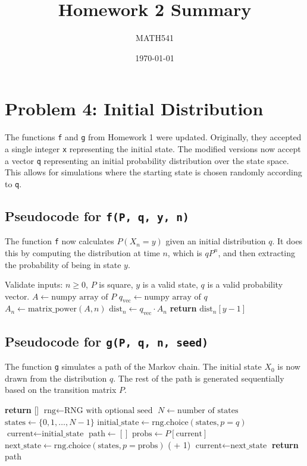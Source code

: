 \documentclass{article}
\title{Homework 2 Summary}
\author{MATH541}
\date{\today}
\begin{document}
\section*{Problem 4: Initial Distribution}

The functions \texttt{f} and \texttt{g} from Homework 1 were updated. Originally, they accepted a single integer \texttt{x} representing the initial state. The modified versions now accept a vector \texttt{q} representing an initial probability distribution over the state space. This allows for simulations where the starting state is chosen randomly according to \texttt{q}.

\subsection*{Pseudocode for \texttt{f(P, q, y, n)}}
The function \texttt{f} now calculates $P(X_n = y)$ given an initial distribution $q$. It does this by computing the distribution at time $n$, which is $q P^n$, and then extracting the probability of being in state $y$.

\begin{algorithmic}[1]
    \State Validate inputs: $n \geq 0$, $P$ is square, $y$ is a valid state, $q$ is a valid probability vector.
    \State $A \gets \text{numpy array of } P$
    \State $q_{\text{vec}} \gets \text{numpy array of } q$
    \State $A_n \gets \text{matrix\_power}(A, n)$
    \State $\text{dist}_n \gets q_{\text{vec}} \cdot A_n$
    \State \textbf{return} $\text{dist}_n[y-1]$
\EndProcedure
\end{algorithmic}

\subsection*{Pseudocode for \texttt{g(P, q, n, seed)}}
The function \texttt{g} simulates a path of the Markov chain. The initial state $X_0$ is now drawn from the distribution $q$. The rest of the path is generated sequentially based on the transition matrix $P$.

\begin{algorithmic}[1]
     \textbf{return} [] \EndIf
    \State $\text{rng} \gets \text{RNG with optional seed}$
    \State $N \gets \text{number of states}$
    \State $\text{states} \gets \{0, 1, \dots, N-1\}$
    \State $\text{initial\_state} \gets \text{rng.choice}(\text{states}, p=q)$
    \State $\text{current} \gets \text{initial\_state}$
    \State $\text{path} \gets []$
        \State $\text{probs} \gets P[\text{current}]$
        \State $\text{next\_state} \gets \text{rng.choice}(\text{states}, p=\text{probs})$
        \State {}( + 1)
        \State $\text{current} \gets \text{next\_state}$
    \EndFor
    \State \textbf{return} path
\EndProcedure
\end{algorithmic}
\end{document}

